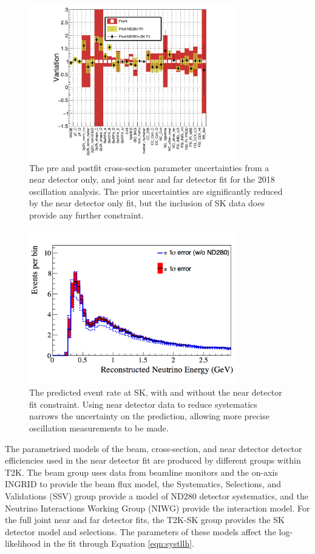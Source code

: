 \begin{figure}[!htbp]
\centering
\includegraphics*[width=0.8\textwidth,clip]{figs/NDSKConstraint}
\caption{The pre and postfit cross-section parameter uncertainties from a near detector only, and joint near and far detector fit for the 2018 oscillation analysis. The prior uncertainties are significantly reduced by the near detector only fit, but the inclusion of SK data does provide any further constraint.}\label{fig:ndskconstraint}
\end{figure}

\begin{figure}[!htbp]
\centering
\includegraphics*[width=0.8\textwidth,clip]{figs/NDConstraint}
\caption{The predicted event rate at SK, with and without the near detector fit constraint. Using near detector data to reduce systematics narrows the uncertainty on the prediction, allowing more precise oscillation measurements to be made.}\label{fig:ndconstraint}
\end{figure}

The parametrised models of the beam, cross-section, and near detector detector efficiencies used in the near detector fit are produced by different groups within T2K. The beam group uses data from beamline monitors and the on-axis INGRID to provide the beam flux model, the Systematics, Selections, and Validations (SSV) group provide a model of ND280 detector systematics, and the Neutrino Interactions Working Group (NIWG) provide the interaction model. For the full joint near and far detector fits, the T2K-SK group provides the SK detector model and selections. The parameters of these models affect the log-likelihood in the fit through Equation \ref{eqn:systllh}.

